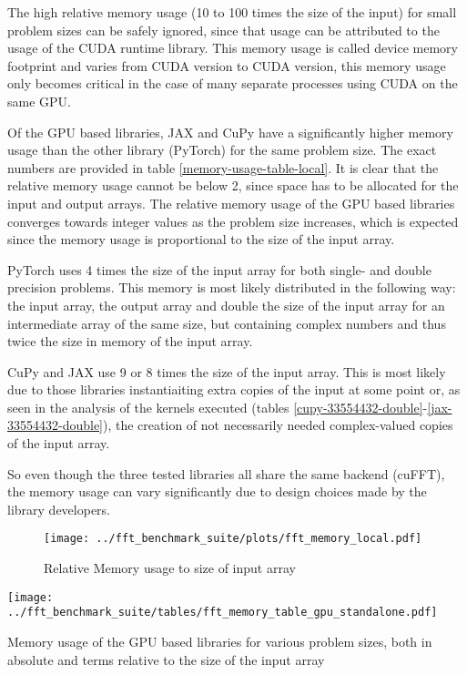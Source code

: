 \documentclass[english,11pt,a4paper,table]{article} %
\begin{document}
The high relative memory usage (10 to 100 times the size of the input) for small problem sizes can be safely ignored, since that usage can be attributed to the usage of the CUDA runtime library.
This memory usage is called device memory footprint and varies from CUDA version to CUDA version, this memory usage only becomes critical in the case of many separate processes using CUDA on the same GPU.

Of the GPU based libraries, JAX and CuPy have a significantly higher memory usage than the other library (PyTorch) for the same problem size.
The exact numbers are provided in table \ref{memory-usage-table-local}.
It is clear that the relative memory usage cannot be below 2, since space has to be allocated for the input and output arrays.
The relative memory usage of the GPU based libraries converges towards integer values as the problem size increases, which is expected since the memory usage is proportional to the size of the input array.

PyTorch uses 4 times the size of the input array for both single- and double precision problems.
This memory is most likely distributed in the following way: the input array, the output array and double the size of the input array for an intermediate array of the same size, but containing complex numbers and thus twice the size in memory of the input array.

CuPy and JAX use 9 or 8 times the size of the input array.
This is most likely due to those libraries instantiaiting extra copies of the input at some point or, as seen in the analysis of the kernels executed (tables \ref{cupy-33554432-double}-\ref{jax-33554432-double}), the creation of not necessarily needed complex-valued copies of the input array.

So even though the three tested libraries all share the same backend (cuFFT), the memory usage can vary significantly due to design choices made by the library developers.

\begin{figure}[H]
	\texttt{[image: ../fft\_benchmark\_suite/plots/fft\_memory\_local.pdf]}
	\caption{Relative Memory usage to size of input array}
	\label{memory-usage-local}
\end{figure}

\begin{table}[H]
	\centering
	\texttt{[image: ../fft\_benchmark\_suite/tables/fft\_memory\_table\_gpu\_standalone.pdf]}
	\caption{Memory usage of the GPU based libraries for various problem sizes, both in absolute and terms relative to the size of the input array}
	\label{memory-usage-table-local}
\end{table}
\end{document}
